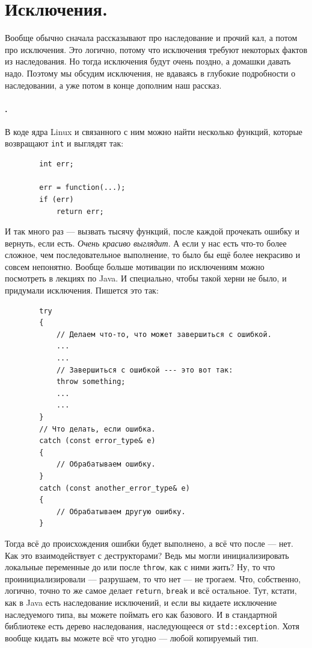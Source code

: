 \documentclass{article}
\begin{document}
    \section{Исключения.}
    Вообще обычно сначала рассказывают про наследование и прочий кал, а потом про исключения. Это логично, потому что исключения требуют некоторых фактов из наследования. Но тогда исключения будут очень поздно, а домашки давать надо. Поэтому мы обсудим исключения, не вдаваясь в глубокие подробности о наследовании, а уже потом в конце дополним наш рассказ.
    \paragraph{.}
    В коде ядра Linux и связанного с ним можно найти несколько функций, которые возвращают \texttt{int} и выглядят так:
    \begin{verbatim}
        int err;
        
        err = function(...);
        if (err)
            return err;
    \end{verbatim}
    И так много раз --- вызвать тысячу функций, после каждой прочекать ошибку и вернуть, если есть. \textit{Очень красиво выглядит}. А если у нас есть что-то более сложное, чем последовательное выполнение, то было бы ещё более некрасиво и совсем непонятно. Вообще больше мотивации по исключениям можно посмотреть в лекциях по Java. И специально, чтобы такой херни не было, и придумали исключения. Пишется это так:
    \begin{verbatim}
        try
        {
            // Делаем что-то, что может завершиться с ошибкой.
            ...
            ...
            // Завершиться с ошибкой --- это вот так:
            throw something;
            ...
            ...
        }
        // Что делать, если ошибка.
        catch (const error_type& e)
        {
            // Обрабатываем ошибку.
        }
        catch (const another_error_type& e)
        {
            // Обрабатываем другую ошибку.
        }
    \end{verbatim}
    Тогда всё до происхождения ошибки будет выполнено, а всё что после --- нет. Как это взаимодействует с деструкторами? Ведь мы могли инициализировать локальные переменные до или после \texttt{throw}, как с ними жить? Ну, то что проинициализировали --- разрушаем, то что нет --- не трогаем. Что, собственно, логично, точно то же самое делает \texttt{return}, \texttt{break} и всё остальное. Тут, кстати, как в Java есть наследование исключений, и если вы кидаете исключение наследуемого типа, вы можете поймать его как базового. И в стандартной библиотеке есть дерево наследования, наследующееся от \texttt{std::exception}. Хотя вообще кидать вы можете всё что угодно --- любой копируемый тип.
\end{document}
